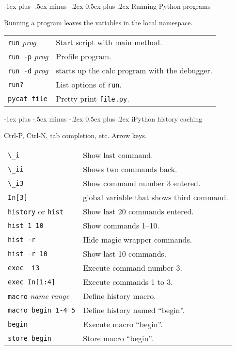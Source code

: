 \documentclass[10pt,landscape]{article}
\makeatletter
\renewcommand{\section}{\@startsection{section}{1}{0mm}%
                                {-1ex plus -.5ex minus -.2ex}%
                                {0.5ex plus .2ex}%
                                {\normalfont\large\bfseries}}
\makeatother
\begin{document}
\begin{multicols}{3}
\begin{tabular}{@{}p{\the\MyLen}%
                @{}p{\linewidth-\the\MyLen}@{}}
\end{tabular}

\section{Running Python programs}

Running a program leaves the variables in the local namespace.

\begin{tabular}{@{}p{\the\MyLen}%
                @{}p{\linewidth-\the\MyLen}@{}}

\verb/run/ \textit{prog} & Start script with main method.\\
\verb/run -p/ \textit{prog} & Profile program.\\
\verb/run -d/ \textit{prog} & starts up the calc program with the debugger.\\
\verb/run?/ & List options of \texttt{run}.\\
\verb/pycat file/ & Pretty print \texttt{file.py}.\\

\end{tabular}

\section{iPython history caching}

Ctrl-P, Ctrl-N, tab completion, etc. Arrow keys.

\begin{tabular}{@{}p{\the\MyLen}%
                @{}p{\linewidth-\the\MyLen}@{}}


\verb/\_i/ &  Show last command.\\
\verb/\_ii/ & Shows two commands back.\\
\verb/\_i3/ & Show command number 3 entered.\\
\verb/In[3]/ & global variable that shows third command.\\
\verb/history/ or \verb/hist/ & Show last 20 commands entered.\\
\verb/hist 1 10/ & Show commands 1--10.\\
\verb/hist -r/ & Hide magic wrapper commands.\\
\verb/hist -r 10/ & Show last 10 commands.\\
\verb/exec _i3/ & Execute command number 3.\\
\verb/exec In[1:4]/ & Execute commands 1 to 3.\\
\verb/macro/ \textit{name} \textit{range} & Define history macro.\\
\verb/macro begin 1-4 5/ & Define history named ``begin''.\\
\verb/begin/ & Execute macro ``begin''.\\
\verb/store begin/ & Store macro ``begin''.\\


\end{tabular}
\end{multicols}
\end{document}
